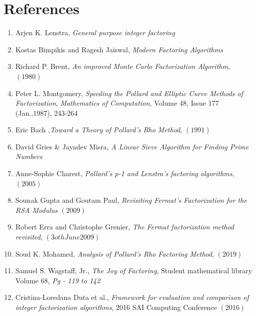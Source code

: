 \documentclass[11pt]{article}
\begin{document}
\section*{References}
\begin{enumerate}
\itemsep-0.5em
    \item Arjen K. Lenstra, \emph{General purpose integer factoring}
    \item Kostas Bimpikis and Ragesh Jaiswal, \emph{Modern Factoring Algorithms}
    \item Richard P. Brent, \emph{An improved Monte Carlo Factorization Algorithm}, $\left( 1980\right)$ 
    \item Peter L. Montgomery, \emph{Speeding the Pollard and Elliptic Curve Methods of Factorization}, \emph{Mathematics of Computation,} Volume 48, Issue 177 (Jan.,1987), 243-264
    \item Eric Bach ,\emph{Toward a Theory of Pollard's Rho Method}, $\left( 1991\right)$
    \item David Gries \& Jayadev Misra, \emph{A Linear Sieve
Algorithm for Finding Prime Numbers }
    \item Anne-Sophie Charest, \emph{Pollard’s p-1 and Lenstra’s factoring
    algorithms}, $\left( 2005\right)$
    \item Sounak Gupta and Goutam Paul, \emph{Revisiting Fermat’s Factorization
    for the RSA Modulus} $\left( 2009\right)$
    \item Robert Erra and Christophe Grenier, \emph{The Fermat factorization method revisited}, $\left( 3oth June 2009\right)$
    \item Soud K. Mohamed, \emph{Analysis of Pollard's Rho Factoring Method}, $\left( 2019\right)$
    \item Samuel S. Wagstaff, Jr., \emph{The Joy of Factoring}, Student mathematical library Volume 68, \emph{Pg - 119 to 142} 
    \item Cristina-Loredana Duta et al., \emph{Framework for evaluation and comparison of integer factorization algorithms}, 2016 SAI Computing Conference $\left( 2016\right)$
\end{enumerate}
\end{document}
